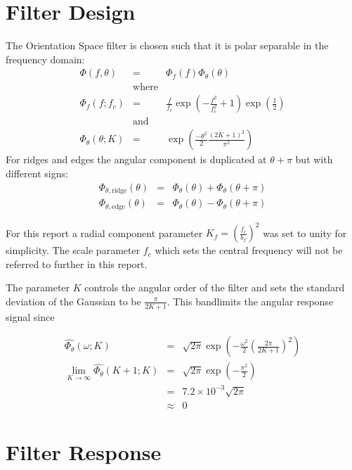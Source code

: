 \documentclass{article}
\begin{document}
\section{Filter Design}
The Orientation Space filter is chosen such that it is polar separable in the frequency domain:
\begin{eqnarray}
    \Phi(f,\theta) & = & \Phi_f(f) \Phi_\theta(\theta) \\
    & \mbox{where} & \nonumber \\
    \Phi_f(f; f_c) & = & \frac{f}{f_c} \exp(-\frac{f^2}{f_c^2}+1) \exp(\frac{1}{2}) \\
    & \mbox{and} & \nonumber \\
    \Phi_\theta(\theta; K) & = & \exp \left(\frac{-\theta^2}{2} \frac{(2K+1)^2}{\pi^2} \right)
\end{eqnarray}
For ridges and edges the angular component is duplicated at $ \theta + \pi $ but with different signs:
\begin{eqnarray}
    \Phi_{\theta,\mbox{ridge}}(\theta) & = & \Phi_{\theta}(\theta) + \Phi_{\theta}(\theta+\pi) \\
    \Phi_{\theta,\mbox{edge}}(\theta) & = & \Phi_{\theta}(\theta) - \Phi_{\theta}(\theta+\pi)
\end{eqnarray}

For this report a radial component parameter $ K_f = (\frac{f_c}{b_f})^2 $ was set to unity for simplicity. The scale parameter $ f_c $ which sets the central frequency will not be referred to further in this report.

The parameter $ K $ controls the angular order of the filter and sets the standard deviation of the Gaussian to be $ \frac{\pi}{2K+1} $. This bandlimits the angular response signal since

\begin{eqnarray}
	\widehat{\Phi_{\theta}}(\omega ; K) & = & \sqrt{2\pi}\exp\left(-\frac{\omega^2}{2} \left(\frac{2\pi}{2K+1}\right)^2\right)\\
	\lim_{K\to\infty} \widehat{\Phi_{\theta}}(K+1 ; K) & = & \sqrt{2\pi} \exp\left(-\frac{\pi^2}{2}\right) \\
	& = & 7.2 \times 10^{-3} \sqrt{2\pi} \\
	& \approx & 0
\end{eqnarray}

\section{Filter Response}
\end{document}
